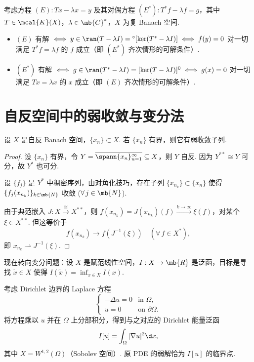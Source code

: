 \begin{lemma}\label{lem:fredholm-alternative}
考虑方程 $(E): Tx - \lambda x = y$ 及其对偶方程 $(E^*): T^*f - \lambda f = g$，其中 $T \in \mcal{K}(X)$，$\lambda \in \mb{C}^*$，$X$ 为复 Banach 空间.
\begin{itemize}
    \item $(E)$ 有解 $\iff y \in \ran(T-\lambda I) = {}^\circ[\ker(T^*-\lambda I)] \iff f(y)=0$ 对一切满足 $T^*f = \lambda f$ 的 $f$ 成立（即 $(E^*)$ 齐次情形的可解条件）.
    \item $(E^*)$ 有解 $\iff g \in \ran(T^*-\lambda I) = [\ker(T-\lambda I)]^0 \iff g(x)=0$ 对一切满足 $Tx = \lambda x$ 的 $x$ 成立（即 $(E)$ 齐次情形的可解条件）.
\end{itemize}
\end{lemma}

\section{自反空间中的弱收敛与变分法}

\begin{theorem}[自反空间中的弱紧性]\label{thm:weak-compact-reflexive}
设 $X$ 是自反 Banach 空间，$\{x_n\} \subset X$. 若 $\{x_n\}$ 有界，则它有弱收敛子列.
\end{theorem}

\begin{proof}
设 $\{x_n\}$ 有界，令 $Y = \overline{\spann\{x_n\}_{n=1}^\infty} \subseteq X$，则 $Y$ 自反. 因为 $Y^{**} \cong Y$ 可分，故 $Y^*$ 也可分.\par
设 $\{f_j\}$ 是 $Y^*$ 中稠密序列，由对角化技巧，存在子列 $\{x_{n_k}\} \subset \{x_n\}$ 使得 $\{f_j(x_{n_k})\}_{k \in \mb{N}}$ 收敛 ($\forall\, j \in \mb{N}$).\par
由于典范嵌入 $J: X \xrightarrow{\cong} X^{**}$，则 $f(x_{n_k}) = J(x_{n_k})(f) \xrightarrow{k \to \infty} \xi(f)$，对某个 $\xi \in X^{**}$. 但这等价于
\begin{equation*}
f(x_{n_k}) \to f(J^{-1}(\xi))\quad (\forall\, f \in X^*),
\end{equation*}
即 $x_{n_k} \rightharpoonup J^{-1}(\xi)$.
\end{proof}

现在转向变分问题：设 $X$ 是赋范线性空间，$I: X \to \mb{R}$ 是泛函，目标是寻找 $\tilde{x} \in X$ 使得 $I(\tilde{x}) = \inf_{x \in X} I(x)$.

\begin{instance}
考虑 Dirichlet 边界的 Laplace 方程
\begin{equation*}
\begin{cases}
-\Delta u = 0 & \text{in } \Omega,\\
u = 0 & \text{on } \partial\Omega.
\end{cases}
\end{equation*}
将方程乘以 $u$ 并在 $\Omega$ 上分部积分，得到与之对应的 Dirichlet 能量泛函
\begin{equation*}
I[u] = \int_\Omega |\nabla u|^2 \d x,
\end{equation*}
其中 $X = W^{1,2}(\Omega)$（Sobolev 空间）. 原 PDE 的弱解恰为 $I[u]$ 的临界点.
\end{instance}

